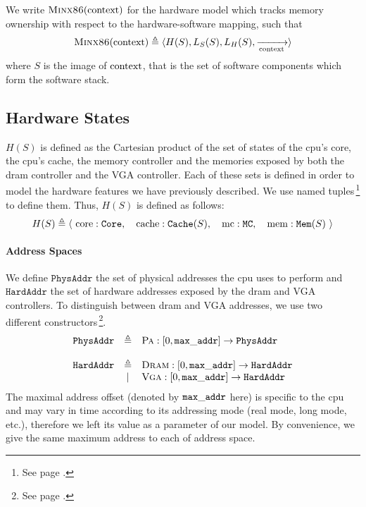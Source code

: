 \begin{definition}
  We write $\textsc{Minx86}(\mathrm{context})$ for the hardware model which
  tracks memory ownership with respect to the  hardware-software
  mapping, such that
%
  \[
    \textsc{Minx86}(\mathrm{context}) \triangleq \langle H(S), L_S(S), L_H(S),
    \xrightarrow[\mathrm{context}]{} \rangle
  \]
  where $S$ is the image of $\mathrm{context}$, that is the set of software
  components which form the software stack.
\end{definition}

\subsection{Hardware States}

$H(S)$ is defined as the Cartesian product of the set of states of the
\ac{cpu}'s core, the \ac{cpu}'s cache, the memory controller and the memories
exposed by both the \ac{dram} controller and the VGA controller.
%
Each of these sets is defined in order to model the hardware features we have
previously described.
%
We use named tuples\,\footnote{See page \pageref{frontmatter:notations}.} to
define them.
%
Thus, $H(S)$ is defined as follows:
%
\[
  H(S) \triangleq \left<\ \mathrm{core}: \texttt{Core},\quad\mathrm{cache}:
  \texttt{Cache}(S),\quad\mathrm{mc}: \texttt{MC},\quad\mathrm{mem}: \texttt{Mem}(S)
  \ \right>
\]

\paragraph{Address Spaces}
%
We define $\texttt{PhysAddr}$ the set of physical addresses the \ac{cpu} uses to
perform \IO and $\texttt{HardAddr}$ the set of hardware addresses exposed by the
\ac{dram} and VGA controllers.
%
To distinguish between \ac{dram} and VGA addresses, we use two different
constructors\,\footnote{See page \pageref{frontmatter:notations}.}.
%
\[
  \begin{array}{rcl}
    \texttt{PhysAddr}
    & \triangleq
    & \textsc{Pa} : [0, \val{max\_addr}] \rightarrow
      \texttt{PhysAddr} \\
    & %
    & \\ %
    \texttt{HardAddr}
    & \triangleq
    & \textsc{Dram} : [0, \val{max\_addr}] \rightarrow
      \texttt{HardAddr} \\
    & |
    & \textsc{Vga} : [0, \val{max\_addr}] \rightarrow
      \texttt{HardAddr}
  \end{array}
\]
%
The maximal address offset (denoted by $\mathtt{max\_addr}$ here) is specific to
the \ac{cpu} and may vary in time according to its addressing mode (real mode,
long mode, etc.), therefore we left its value as a parameter of our model.
%
By convenience, we give the same maximum address to each of address space.

